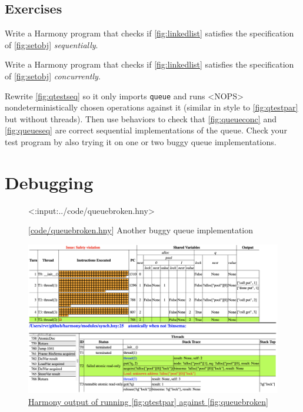 \documentclass{report}
\newcommand{\harmonylink}[1]{%
[\href{https://harmony.cs.cornell.edu/#1}{\underline{#1}}]%
}
\newcommand{\harmonyref}[2]{%
\href{https://harmony.cs.cornell.edu/output/#1}{\underline{#2}}%
}
\newenvironment{code}{
\tcolorbox
}{
\endtcolorbox
}
\begin{document}
\section*{Exercises}
\begin{problems}
\item Write a Harmony program that checks if
\autoref{fig:linkedlist} satisfies the specification
of \autoref{fig:setobj} \emph{sequentially}.
\item Write a Harmony program that checks if
\autoref{fig:linkedlist} satisfies the specification
of \autoref{fig:setobj} \emph{concurrently}.
\item Rewrite \autoref{fig:qtestseq} so it only imports \texttt{queue}
and runs <{NOPS}> nondeterministically chosen operations against
it (similar in style to \autoref{fig:qtestpar} but without threads).
Then use behaviors to check that \autoref{fig:queueconc} and
\autoref{fig:queueseq} are correct sequential implementations of
the queue.  Check your test program by also trying it on one or two
buggy queue implementations.
\end{problems}

\chapter{Debugging}
\label{ch:debugging}

\begin{figure}
\begin{code}
<{:input:../code/queuebroken.hny}>
\end{code}
\caption{\harmonylink{code/queuebroken.hny} Another buggy queue implementation}
\label{fig:queuebroken}
\end{figure}

\begin{figure}
\begin{center}
\includegraphics[width=\textwidth]{figures/queuebroken1.png}
\end{center}
\caption{\harmonyref{queuebug.html}{Harmony output of running
\autoref{fig:qtestpar} against \autoref{fig:queuebroken}}}
\label{fig:queuebroken1}
\end{figure}
\end{document}
